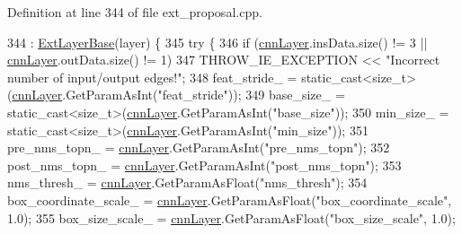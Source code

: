 Definition at line 344 of file ext\+\_\+proposal.\+cpp.


\begin{DoxyCode}
344                                                 : \hyperlink{classInferenceEngine_1_1Extensions_1_1Cpu_1_1ExtLayerBase_affff0e8263ca26852ccf71d299d7b06a}{ExtLayerBase}(layer) \{
345         \textcolor{keywordflow}{try} \{
346             \textcolor{keywordflow}{if} (\hyperlink{classInferenceEngine_1_1Extensions_1_1Cpu_1_1ExtLayerBase_a1074cdccacb9e9ca6eec01bbc2f7ca4a}{cnnLayer}.insData.size() != 3 || \hyperlink{classInferenceEngine_1_1Extensions_1_1Cpu_1_1ExtLayerBase_a1074cdccacb9e9ca6eec01bbc2f7ca4a}{cnnLayer}.outData.size() != 1)
347                 THROW\_IE\_EXCEPTION << \textcolor{stringliteral}{"Incorrect number of input/output edges!"};
348             feat\_stride\_ = \textcolor{keyword}{static\_cast<}\textcolor{keywordtype}{size\_t}\textcolor{keyword}{>}(\hyperlink{classInferenceEngine_1_1Extensions_1_1Cpu_1_1ExtLayerBase_a1074cdccacb9e9ca6eec01bbc2f7ca4a}{cnnLayer}.GetParamAsInt(\textcolor{stringliteral}{"feat\_stride"}));
349             base\_size\_ = \textcolor{keyword}{static\_cast<}\textcolor{keywordtype}{size\_t}\textcolor{keyword}{>}(\hyperlink{classInferenceEngine_1_1Extensions_1_1Cpu_1_1ExtLayerBase_a1074cdccacb9e9ca6eec01bbc2f7ca4a}{cnnLayer}.GetParamAsInt(\textcolor{stringliteral}{"base\_size"}));
350             min\_size\_ = \textcolor{keyword}{static\_cast<}\textcolor{keywordtype}{size\_t}\textcolor{keyword}{>}(\hyperlink{classInferenceEngine_1_1Extensions_1_1Cpu_1_1ExtLayerBase_a1074cdccacb9e9ca6eec01bbc2f7ca4a}{cnnLayer}.GetParamAsInt(\textcolor{stringliteral}{"min\_size"}));
351             pre\_nms\_topn\_ = \hyperlink{classInferenceEngine_1_1Extensions_1_1Cpu_1_1ExtLayerBase_a1074cdccacb9e9ca6eec01bbc2f7ca4a}{cnnLayer}.GetParamAsInt(\textcolor{stringliteral}{"pre\_nms\_topn"});
352             post\_nms\_topn\_ = \hyperlink{classInferenceEngine_1_1Extensions_1_1Cpu_1_1ExtLayerBase_a1074cdccacb9e9ca6eec01bbc2f7ca4a}{cnnLayer}.GetParamAsInt(\textcolor{stringliteral}{"post\_nms\_topn"});
353             nms\_thresh\_ = \hyperlink{classInferenceEngine_1_1Extensions_1_1Cpu_1_1ExtLayerBase_a1074cdccacb9e9ca6eec01bbc2f7ca4a}{cnnLayer}.GetParamAsFloat(\textcolor{stringliteral}{"nms\_thresh"});
354             box\_coordinate\_scale\_ = \hyperlink{classInferenceEngine_1_1Extensions_1_1Cpu_1_1ExtLayerBase_a1074cdccacb9e9ca6eec01bbc2f7ca4a}{cnnLayer}.GetParamAsFloat(\textcolor{stringliteral}{"box\_coordinate\_scale"}, 1.0);
355             box\_size\_scale\_ = \hyperlink{classInferenceEngine_1_1Extensions_1_1Cpu_1_1ExtLayerBase_a1074cdccacb9e9ca6eec01bbc2f7ca4a}{cnnLayer}.GetParamAsFloat(\textcolor{stringliteral}{"box\_size\_scale"}, 1.0);

\end{DoxyCode}
